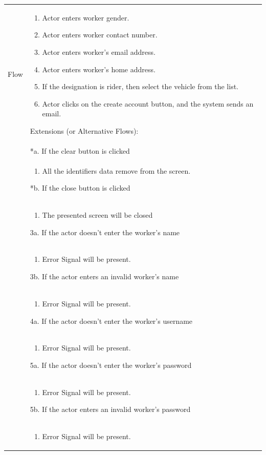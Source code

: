 \documentclass[12pt,a4paper]{report}
\begin{document}
\begin{tabular}{ | m{3cm} | m{12cm}| } \hline
Flow &
\begin{enumerate}
\item Actor enters worker gender. 
\item Actor enters worker contact number. 
\item Actor enters worker's email address.
\item Actor enters worker's home address. 
\item If the designation is rider, then select the vehicle from the list.
\item Actor clicks on the create account button, and the system sends an email.
\end{enumerate}
Extensions (or Alternative Flows):\\
& *a. If the clear button is clicked \\
& \begin{enumerate}
		\item All the identifiers data remove from the screen.
	\end{enumerate}
*b. If the close button is clicked\\
&	\begin{enumerate}
		\item The presented screen will be closed
	\end{enumerate}
3a. If the actor doesn't enter the worker's name \\ 	
&	\begin{enumerate}
		\item Error Signal will be present.
	\end{enumerate}
3b. If the actor enters an invalid worker's name \\ 	
&	\begin{enumerate}
		\item Error Signal will be present.
	\end{enumerate}
4a. If the actor doesn't enter the worker's username\\ 	
&	\begin{enumerate}
		\item Error Signal will be present.
	\end{enumerate}
5a. If the actor doesn't enter the worker's password \\ 	
&	\begin{enumerate}
		\item Error Signal will be present.
	\end{enumerate}
5b. If the actor enters an invalid worker's password \\ 	
&	\begin{enumerate}
		\item Error Signal will be present.
	\end{enumerate}
\\ \hline
\end{tabular}
\end{document}
